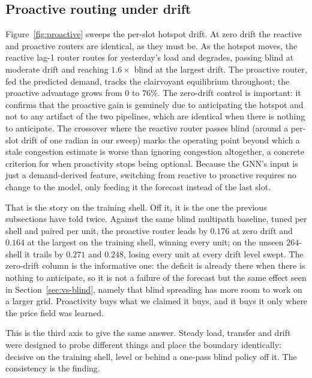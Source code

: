 \documentclass[journal]{IEEEtran}
\begin{document}
\subsection{Proactive routing under drift}
Figure~\ref{fig:proactive} sweeps the per-slot hotspot drift. At zero drift the reactive
and proactive routers are identical, as they must be. As the hotspot moves, the reactive
lag-1 router routes for yesterday's load and degrades, passing blind at moderate drift
and reaching $1.6\times$ blind at the largest drift. The proactive router, fed the
predicted demand, tracks the clairvoyant equilibrium throughout; the proactive advantage
grows from $0$ to $76\%$. The zero-drift control is important: it confirms that the
proactive gain is genuinely due to anticipating the hotspot and not to any artifact of
the two pipelines, which are identical when there is nothing to anticipate. The crossover
where the reactive router passes blind (around a per-slot drift of one radian in our
sweep) marks the operating point beyond which a stale congestion estimate is worse than
ignoring congestion altogether, a concrete criterion for when proactivity stops being optional. Because the GNN's input is just a demand-derived feature, switching from
reactive to proactive requires no change to the model, only feeding it the forecast
instead of the last slot.

That is the story on the training shell. Off it, it is the one the previous subsections have told twice. Against the same blind multipath baseline, tuned per shell and paired per unit, the proactive router leads by $0.176$ at zero drift and $0.164$ at the largest on the training shell, winning every unit; on the unseen $264$-shell it trails by $0.271$ and $0.248$, losing every unit at every drift level swept. The zero-drift column is the informative one: the deficit is already there when there is
nothing to anticipate, so it is not a failure of the forecast but the same effect seen in
Section~\ref{sec:vs-blind}, namely that blind spreading has more room to work on a larger grid.
Proactivity buys what we claimed it buys, and it buys it only where the price field was learned.

This is the third axis to give the same answer. Steady load, transfer and drift were designed to probe different things and place the boundary identically: decisive on the training shell, level or behind a one-pass blind policy off it. The consistency is the finding.
\end{document}
